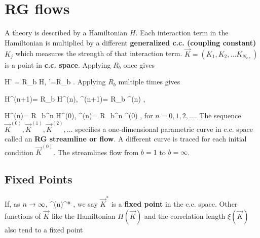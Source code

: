 %
%
%
%
%
%








\section{RG flows}
A theory is described by a Hamiltonian
$H$. Each interaction term
in the Hamiltonian is
multiplied
by a different \textbf{generalized c.c. (coupling
constant)} $K_j$
which measures
the strength of that
interaction term. 
$\vec{K} = (K_1, K_2, \ldots K_{N_{c.c.}})$
is a point in {\bf c.c. space}.
Applying $R_b$ once
gives

\beq
H' = R_b H,\;\; '=R_b
\;.
\eeq
Applying $R_b$ multiple times gives

\beq
H^{(n+1)}= R_b H^{(n)},
\;\;
^{(n+1)}= R_b ^{(n)}
\;,
\eeq

\beq
H^{(n)}= R_b^n H^{(0)},
\;\;
^{(n)}= R_b^n ^{(0)}
\;,
\eeq
for $n=0,1,2, \ldots$. The
sequence $\vec{K}^{(0)},
\vec{K}^{(1)}, \vec{K}^{(2)}, \ldots$
specifies 
 a one-dimensional parametric curve in c.c. space
called an {\bf RG streamline or flow}. A different curve
is traced for
each initial condition
$\vec{K}^{(0)}$. The streamlines
flow from $b=1$ to $b=\infty$.

\subsection{Fixed Points}
If, as $n\rightarrow \infty$,
\beq
{}^{(n)}\rightarrow {}^*
\;,
\eeq
we say $\vec{K}^*$ is a
\textbf{fixed point} in the c.c. space.
Other functions of $\vec{K}$
like the Hamiltonian $H(\vec{K})$
and the correlation length $\xi(\vec{K})$
also tend to a fixed point

